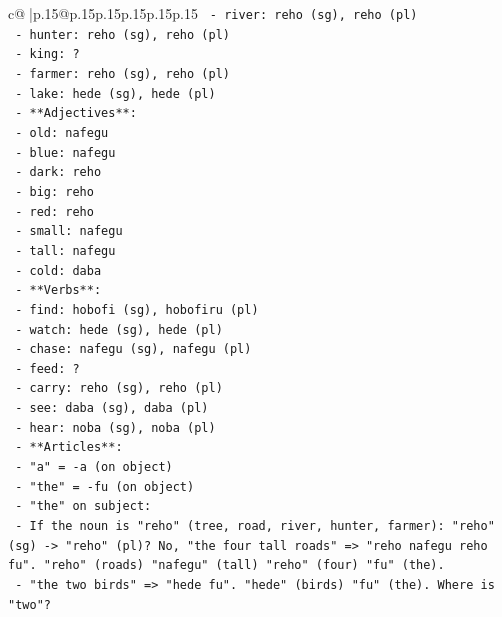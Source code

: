 \documentclass{article}
\begin{document}
{\begin{supertabular}{c@{$\;$}|p{.15\linewidth}@{}p{.15\linewidth}p{.15\linewidth}p{.15\linewidth}p{.15\linewidth}p{.15\linewidth}}
{{{\texttt{            {-} river: reho (sg), reho (pl)} \\
\texttt{            {-} hunter: reho (sg), reho (pl)} \\
\texttt{            {-} king: ?} \\
\texttt{            {-} farmer: reho (sg), reho (pl)} \\
\texttt{            {-} lake: hede (sg), hede (pl)} \\
\texttt{        {-} **Adjectives**:} \\
\texttt{            {-} old: nafegu} \\
\texttt{            {-} blue: nafegu} \\
\texttt{            {-} dark: reho} \\
\texttt{            {-} big: reho} \\
\texttt{            {-} red: reho} \\
\texttt{            {-} small: nafegu} \\
\texttt{            {-} tall: nafegu} \\
\texttt{            {-} cold: daba} \\
\texttt{        {-} **Verbs**:} \\
\texttt{            {-} find: hobofi (sg), hobofiru (pl)} \\
\texttt{            {-} watch: hede (sg), hede (pl)} \\
\texttt{            {-} chase: nafegu (sg), nafegu (pl)} \\
\texttt{            {-} feed: ?} \\
\texttt{            {-} carry: reho (sg), reho (pl)} \\
\texttt{            {-} see: daba (sg), daba (pl)} \\
\texttt{            {-} hear: noba (sg), noba (pl)} \\
\texttt{        {-} **Articles**:} \\
\texttt{            {-} "a" = {-}a (on object)} \\
\texttt{            {-} "the" = {-}fu (on object)} \\
\texttt{            {-} "the" on subject:} \\
\texttt{                {-} If the noun is "reho" (tree, road, river, hunter, farmer): "reho" (sg) {-}> "reho" (pl)? No, "the four tall roads" => "reho nafegu reho fu". "reho" (roads) "nafegu" (tall) "reho" (four) "fu" (the).} \\
\texttt{                {-} "the two birds" => "hede fu". "hede" (birds) "fu" (the). Where is "two"?} \\
}}}
\end{supertabular}}
\end{document}
